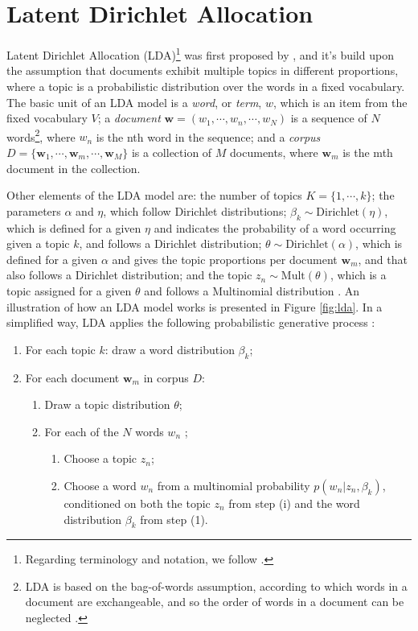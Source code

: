 \section{Latent Dirichlet Allocation} \label{LDA}

Latent Dirichlet Allocation (LDA)\footnote{Regarding terminology and notation, we follow \cite{blei_latent_2003}.} was first proposed by \cite{blei_latent_2003}, and it's build upon the assumption that documents exhibit multiple topics in different proportions, where a topic is a probabilistic distribution over the words in a fixed vocabulary. The basic unit of an LDA model is a \textit{word}, or \textit{term}, $w$, which is an item from the fixed vocabulary $V$; a \textit{document} $\mathbf{w} = (w_{1}, \cdots, w_{n}, \cdots, w_{N})$ is a sequence of $N$ words\footnote{LDA is based on the bag-of-words assumption, according to which words in a document are exchangeable, and so the order of words in a document can be neglected \citep{blei_latent_2003}.}, where $w_{n}$ is the nth word in the sequence; and a \textit{corpus} $D = \{ \mathbf{w}_{1}, \cdots, \mathbf{w}_{m}, \cdots, \mathbf{w}_{M} \}$ is a collection of $M$ documents, where $\mathbf{w}_{m}$ is the mth document in the collection. 

Other elements of the LDA model are: the number of topics $K = \{ 1, \cdots, k \}$; the parameters $\alpha$ and $\eta$, which follow Dirichlet distributions; $\beta_{k} \sim \text{Dirichlet}(\eta)$, which is defined for a given $\eta$ and indicates the probability of a word occurring given a topic $k$, and follows a Dirichlet distribution; $\theta \sim \text{Dirichlet}(\alpha)$, which is defined for a given $\alpha$ and gives the topic proportions per document $\mathbf{w}_{m}$, and that also follows a Dirichlet distribution; and the topic $z_{n} \sim \text{Mult}(\theta)$, which is a topic assigned for a given $\theta$ and follows a Multinomial distribution \citep{blei_latent_2003, blei_topic_2009, grun_topicmodels_2011}. An illustration of how an LDA model works is presented in Figure \ref{fig:lda}. In a simplified way, LDA applies the following probabilistic generative process \citep{blei_topic_2009, grun_topicmodels_2011, ponweiser_latent_2012}:

\begin{enumerate}
\item For each topic $k$: draw a word distribution $\beta_{k}$;
\item For each document $\mathbf{w}_{m}$ in corpus $D$:
\begin{enumerate}
	\item Draw a topic distribution $\theta$;
	\item For each of the $N$ words $w_{n}$	;
	\begin{enumerate}
		\item Choose a topic $z_{n}$;
		\item Choose a word $w_{n}$ from a multinomial probability $p(w_{n} | z_{n}, \beta_{k})$, conditioned on both the topic $z_{n}$ from step (i) and the word distribution $\beta_{k}$ from step (1).
	\end{enumerate}
\end{enumerate}
\end{enumerate} 

